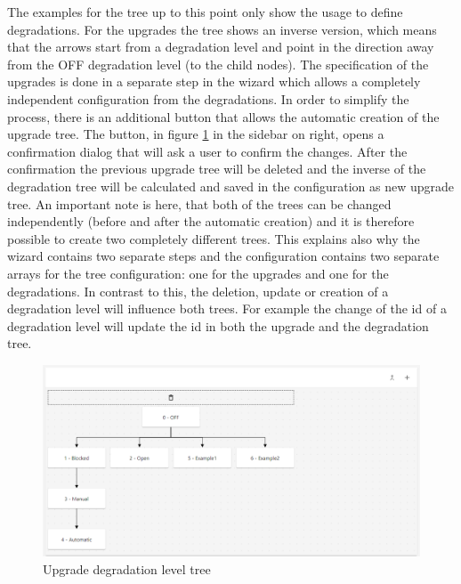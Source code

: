 The examples for the tree up to this point only show the usage to define degradations. For the upgrades the tree shows an inverse version, which means that the arrows start from a degradation level and point in the direction away from the OFF degradation level (to the child nodes). The specification of the upgrades is done in a separate step in the wizard which allows a completely independent configuration from the degradations. In order to simplify the process, there is an additional button that allows the automatic creation of the upgrade tree. The button, in figure \ref{fig:upgrade_level_tree_drop} in the sidebar on right, opens a confirmation dialog that will ask a user to confirm the changes. After the confirmation the previous upgrade tree will be deleted and the inverse of the degradation tree will be calculated and saved in the configuration as new upgrade tree. An important note is here, that both of the trees can be changed independently (before and after the automatic creation) and it is therefore possible to create two completely different trees. This explains also why the wizard contains two separate steps and the configuration contains two separate arrays for the tree configuration: one for the upgrades and one for the degradations. In contrast to this, the deletion, update or creation of a degradation level will influence both trees. For example the change of the id of a degradation level will update the id in both the upgrade and the degradation tree.

\begin{figure}[ht]
    \centering
    \includegraphics[width=\textwidth]{img/upgrade_tree.png}
    \caption{Upgrade degradation level tree}
    \label{fig:upgrade_level_tree_drop}
\end{figure}

